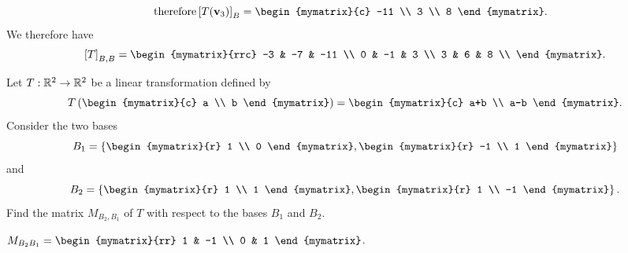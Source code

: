 \begin{ex}
\begin{sol}
\begin{enumerate}
\begin{equation*}
          \quad\mbox{therefore}
          \coord{T(\vect{v}_3)}_B =
          \begin{mymatrix}{c} -11 \\ 3 \\ 8 \end{mymatrix}.
        \end{equation*}
        We therefore have
        \begin{equation*}
          \coord{T}_{B,B} =
          \begin{mymatrix}{rrc}
            -3 & -7 & -11 \\
            0  & -1 &   3 \\
            3  &  6 &   8 \\
          \end{mymatrix}.
        \end{equation*}
      \end{enumerate}
\end{sol}
\end{ex}

\begin{ex}
  Let $T: \mathbb{R}^2 \to \mathbb{R}^2$ be a linear transformation defined by
  \begin{equation*}
    T \paren{\begin{mymatrix}{c} a \\ b \end{mymatrix}}
    = \begin{mymatrix}{c} a+b \\ a-b \end{mymatrix}.
  \end{equation*}
  Consider the two bases
  \begin{equation*}
    B_1 = \set{\begin{mymatrix}{r} 1 \\ 0 \end{mymatrix},
      \begin{mymatrix}{r} -1 \\ 1 \end{mymatrix}
    }
  \end{equation*}
  and
  \begin{equation*}
    B_2 = \set{\begin{mymatrix}{r} 1 \\ 1 \end{mymatrix},
      \begin{mymatrix}{r} 1 \\ -1 \end{mymatrix}
    }.
  \end{equation*}
  Find the matrix $M_{B_2,B_1}$ of $T$ with respect to the bases $B_1$
  and $B_2$.
  \begin{sol}
    $M_{B_2 B_1} = \begin{mymatrix}{rr}
      1 & -1 \\
      0 & 1
    \end{mymatrix}$.
  \end{sol}
\end{ex}

